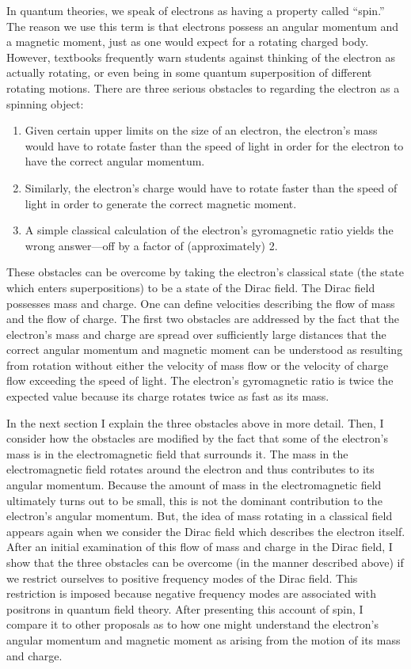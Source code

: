 \documentclass[12pt,secnumarabic,amsmath,amssymb,balancelastpage,nofootinbib]{article}
\begin{document}
In quantum theories, we speak of electrons as having a property called ``spin.''  The reason we use this term is that electrons possess an angular momentum and a magnetic moment, just as one would expect for a rotating charged body.  However, textbooks frequently warn students against thinking of the electron as actually rotating, or even being in some quantum superposition of different rotating motions.  There are three serious obstacles to regarding the electron as a spinning object:
\begin{enumerate}
\item Given certain upper limits on the size of an electron, the electron's mass would have to rotate faster than the speed of light in order for the electron to have the correct angular momentum.
\item Similarly, the electron's charge would have to rotate faster than the speed of light in order to generate the correct magnetic moment.
\item A simple classical calculation of the electron's gyromagnetic ratio yields the wrong answer---off by a factor of (approximately) 2.
\end{enumerate}
These obstacles can be overcome by taking the electron's classical state (the state which enters superpositions) to be a state of the Dirac field.  The Dirac field possesses mass and charge.  One can define velocities describing the flow of mass and the flow of charge.  The first two obstacles are addressed by the fact that the electron's mass and charge are spread over sufficiently large distances that the correct angular momentum and magnetic moment can be understood as resulting from rotation without either the velocity of mass flow or the velocity of charge flow exceeding the speed of light.  The electron's gyromagnetic ratio is twice the expected value because its charge rotates twice as fast as its mass.

In the next section I explain the three obstacles above in more detail.  Then, I consider how the obstacles are modified by the fact that some of the electron's mass is in the electromagnetic field that surrounds it.  The mass in the electromagnetic field rotates around the electron and thus contributes to its angular momentum.  Because the amount of mass in the electromagnetic field ultimately turns out to be small, this is not the dominant contribution to the electron's angular momentum.  But, the idea of mass rotating in a classical field appears again when we consider the Dirac field which describes the electron itself.  After an initial examination of this flow of mass and charge in the Dirac field, I show that the three obstacles can be overcome (in the manner described above) if we restrict ourselves to positive frequency modes of the Dirac field.  This restriction is imposed because negative frequency modes are associated with positrons in quantum field theory.  After presenting this account of spin, I compare it to other proposals as to how one might understand the electron's angular momentum and magnetic moment as arising from the motion of its mass and charge.
\end{document}
